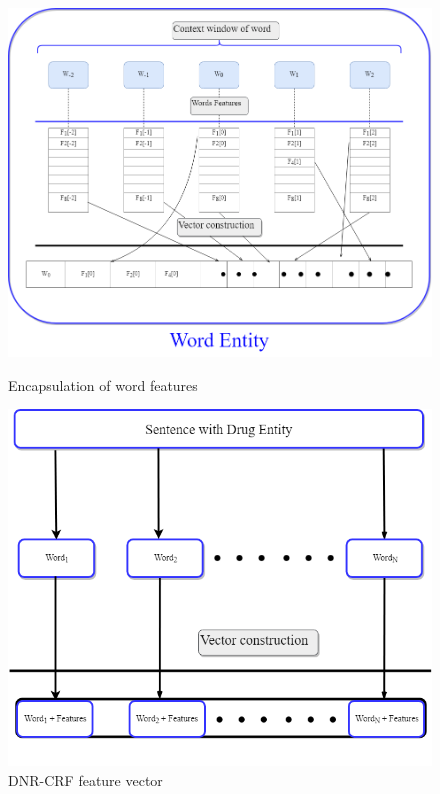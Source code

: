 \begin{figure}[H]
%
  \centering
  \includegraphics[width=0.8\linewidth]{wordEntity.png}
  \caption{Encapsulation of word features}\label{groupwordfeatures}
\endminipage\hfill
{}
    \includegraphics[scale=0.3]{CRF.png}\caption{DNR-CRF feature vector}\label{dnrcrf}
\endminipage
\end{figure}









